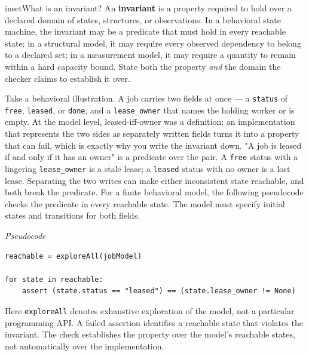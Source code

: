 \begin{bookbox}{inset}{What is an invariant?}
\label{inset-invariant}
An \textbf{invariant} is a property required to hold over a declared domain of states, structures, or observations. In a behavioral state machine, the invariant may be a predicate that must hold in every reachable state; in a structural model, it may require every observed dependency to belong to a declared set; in a measurement model, it may require a quantity to remain within a hard capacity bound. State both the property \emph{and} the domain the checker claims to establish it over.

Take a behavioral illustration. A job carries two fields at once --- a \texttt{status} of \texttt{free}, \texttt{leased}, or \texttt{done}, and a \texttt{lease\_owner} that names the holding worker or is empty. At the model level, leased-iff-owner was a definition; an implementation that represents the two sides as separately written fields turns it into a property that can fail, which is exactly why you write the invariant down. "A job is leased if and only if it has an owner" is a predicate over the pair. A \texttt{free} status with a lingering \texttt{lease\_owner} is a stale lease; a \texttt{leased} status with no owner is a lost lease. Separating the two writes can make either inconsistent state reachable, and both break the predicate. For a finite behavioral model, the following pseudocode checks the predicate in every reachable state. The model must specify initial states and transitions for both fields.

\emph{Pseudocode}
\begin{verbatim}
reachable = exploreAll(jobModel)

for state in reachable:
    assert (state.status == "leased") == (state.lease_owner != None)
\end{verbatim}

Here \texttt{exploreAll} denotes exhaustive exploration of the model, not a particular programming API. A failed assertion identifies a reachable state that violates the invariant. The check establishes the property over the model's reachable states, not automatically over the implementation.
\end{bookbox}


